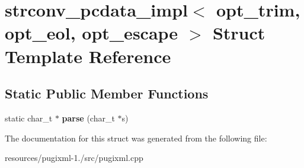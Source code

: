 \hypertarget{structstrconv__pcdata__impl}{\section{strconv\+\_\+pcdata\+\_\+impl$<$ opt\+\_\+trim, opt\+\_\+eol, opt\+\_\+escape $>$ Struct Template Reference}
\label{structstrconv__pcdata__impl}
}
\subsection*{Static Public Member Functions}
\begin{DoxyCompactItemize}
\item 
\hypertarget{structstrconv__pcdata__impl_a0bd2c80c1df06c93d77332a4bb63b5b8}{static char\+\_\+t $\ast$ {\bfseries parse} (char\+\_\+t $\ast$s)}\label{structstrconv__pcdata__impl_a0bd2c80c1df06c93d77332a4bb63b5b8}

\end{DoxyCompactItemize}


The documentation for this struct was generated from the following file\+:\begin{DoxyCompactItemize}
\item 
resources/pugixml-\/1./src/pugixml.\+cpp\end{DoxyCompactItemize}
